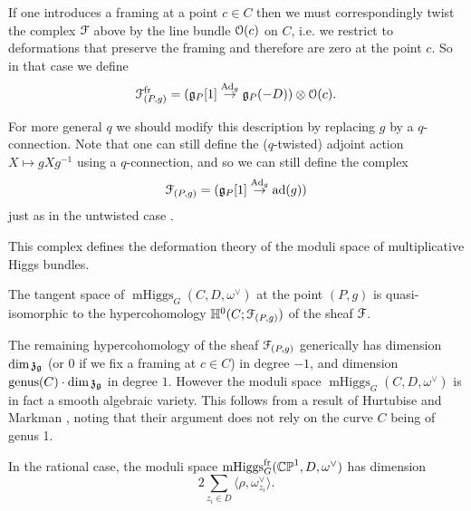 \documentclass[10pt, oneside]{article}
\DeclareMathOperator{\mhiggs}{mHiggs}
\newcommand{\fr}{\mathrm{fr}}
\renewcommand{\ad}{\mr{ad}}
\newcommand{\Ad}{\mr{Ad}}
\begin{document}
\begin{remark}
  If one introduces a framing at a point $c \in C$ then we must correspondingly twist the complex $\mathcal{F}$ above by the line bundle $\mathcal{O}(c)$ on $C$, i.e. we restrict to deformations that preserve the framing and therefore are zero at the point $c$.  So in that case we define
\[\mc F^\fr_{(P,g)} = (\gg_P[1] \overset {\Ad_g} {\to} \gg_P(-D)) \otimes \OO(c).\]
\end{remark}

\begin{remark}
For more general $q$ we should modify this description by replacing $g$ by a $q$-connection.  Note that one can still define the ($q$-twisted) adjoint action $X \mapsto g X g^{-1}$ using a $q$-connection, and so we can still define the complex
\[\mc F_{(P,g)} = (\gg_P[1] \overset {\Ad_g} {\to} \ad(g))\]
just as in the untwisted case .
\end{remark}

This complex defines the deformation theory of the moduli space of multiplicative Higgs bundles.

\begin{prop}
The tangent space of $\mhiggs_G(C, D, \omega^\vee)$ at the point $(P,g)$ is quasi-isomorphic to the hypercohomology $\mathbb{H}^0(C; \mathcal{F}_{(P,g)})$ of the sheaf $\mathcal{F}$.
\end{prop}

\begin{remark}
The remaining hypercohomology of the sheaf $\mathcal{F}_{(P,g)}$ generically has dimension $\dim \mathfrak{z}_{\mathfrak{g}}$ (or 0 if we fix a framing at $c \in C$) in degree $-1$, and dimension $\mathrm{genus}(C) \cdot \dim \mathfrak{z}_{\mathfrak{g}}$ in degree $1$.  However the moduli space $\mhiggs_G(C, D,\omega^\vee)$ is in fact a smooth algebraic variety.  This follows from a result of Hurtubise and Markman \cite[Theorem 4.13]{HurtubiseMarkman}, noting that their argument does not rely on the curve $C$ being of genus 1.
\end{remark}

\begin{corollary} \label{dim_of_moduli_space_cor}
In the rational case, the moduli space $\mhiggs^\fr_G(\bb{CP}^1, D, \omega^\vee)$ has dimension 
\[2 \sum_{z_i \in D} \langle \rho, \omega^\vee_{z_i} \rangle.\]
\end{corollary}
\end{document}
